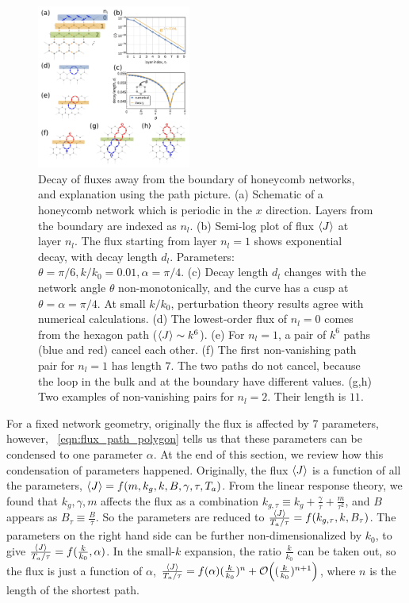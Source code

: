 \documentclass[
 preprint,
 preprintnumbers,
 amsmath,amssymb,
 aps,
 pre,
 longbibliography,
 10pt, twocolumn
]{revtex4-1}
\begin{document}
\begin{figure}[ht]
	\centering
	\includegraphics[width=0.45\textwidth]{5_path_decay.pdf}
    \caption{Decay of fluxes away from the boundary of honeycomb networks, and explanation using the path picture.
    (a) Schematic of a honeycomb network which is periodic in the $x$ direction. Layers from the boundary are indexed as $n_l$.
    (b) Semi-log plot of flux $\expval{J}$ at layer $n_l$. The flux starting from layer $n_l=1$ shows exponential decay, with decay length $d_l$. Parameters: $\theta = \pi/6, k/k_0 = 0.01, \alpha = \pi/4$.
    (c) Decay length $d_l$ changes with the network angle $\theta$ non-monotonically, and the curve has a cusp at $\theta = \alpha = \pi/4$. At small $k/k_0$, perturbation theory results agree with numerical calculations.
    (d) The lowest-order flux of $n_l=0$ comes from the hexagon path ($\expval{J}\sim k^6$).
    (e) For $n_l=1$, a pair of $k^6$ paths (blue and red) cancel each other. 
    (f) The first non-vanishing path pair for $n_l=1$ has length $7$. The two paths do not cancel, because the loop in the bulk and at the boundary have different values.
    (g,h) Two examples of non-vanishing pairs for $n_l=2$. Their length is $11$.
    }
    \label{fig:path_decay}
\end{figure}

For a fixed network geometry, originally the flux is affected by $7$ parameters, however, \eqnname~\eqref{eqn:flux_path_polygon} tells us that these parameters can be condensed to one parameter $\alpha$. 
At the end of this section, we review how this condensation of parameters happened.
Originally, the flux $\expval{J}$ is a function of all the parameters, $\expval{J} = f(m, k_g, k, B, \gamma, \tau, T_a)$.
From the linear response theory, we found that $k_g, \gamma, m$ affects the flux as a combination $k_{g,\tau} \equiv k_g + \frac{\gamma}{\tau} + \frac{m}{\tau^2}$, and $B$ appears as $B_\tau \equiv \frac{B}{\tau}$. So the parameters are reduced to $\frac{\expval{J}}{T_a/\tau} = f(k_{g,\tau}, k, B_\tau)$.
The parameters on the right hand side can be further non-dimensionalized by  $k_0$, to give $\frac{\expval{J}}{T_a/\tau} = f(\frac{k}{k_0}, \alpha)$.
In the small-$k$ expansion, the ratio $\frac{k}{k_0}$ can be taken out, so the flux is just a function of $\alpha$, $\frac{\expval{J}}{T_a/\tau} = f(\alpha) (\frac{k}{k_0})^n + \order{(\frac{k}{k_0})^{n+1}}$, where $n$ is the length of the shortest path.
\end{document}
